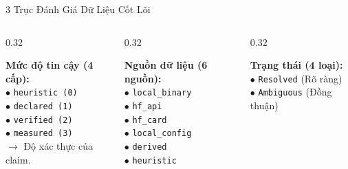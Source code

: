 \documentclass[aspectratio=169, xcolor=table]{beamer}
\begin{document}
\begin{frame}{3 Trục Đánh Giá Dữ Liệu Cốt Lõi}
    \begin{columns}[onlytextwidth, T]
        \begin{column}{0.32\textwidth}
            \begin{infobox}
                \scriptsize
                \textbf{Mức độ tin cậy (4 cấp):}\\
                $\bullet$ \texttt{heuristic (0)}\\
                $\bullet$ \texttt{declared (1)}\\
                $\bullet$ \texttt{verified (2)}\\
                $\bullet$ \texttt{measured (3)}\\
                \vspace{2pt}
                $\to$ Độ xác thực của claim.
            \end{infobox}
        \end{column}
        \hfill
        \begin{column}{0.32\textwidth}
            \begin{infobox}
                \scriptsize
                \textbf{Nguồn dữ liệu (6 nguồn):}\\
                $\bullet$ \texttt{local\_binary}\\
                $\bullet$ \texttt{hf\_api}\\
                $\bullet$ \texttt{hf\_card}\\
                $\bullet$ \texttt{local\_config}\\
                $\bullet$ \texttt{derived}\\
                $\bullet$ \texttt{heuristic}
            \end{infobox}
        \end{column}
        \hfill
        \begin{column}{0.32\textwidth}
            \begin{infobox}
                \scriptsize
                \textbf{Trạng thái (4 loại):}\\
                $\bullet$ \texttt{Resolved} (Rõ ràng)\\
                $\bullet$ \texttt{Ambiguous} (Đồng thuận)\\

\end{infobox}
\end{column}
\end{columns}
\end{frame}
\end{document}
